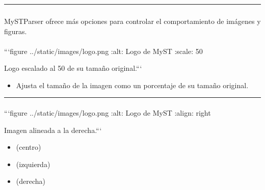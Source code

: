 \documentclass[a4paper,10pt,oneside,spanish,openany]{sphinxmanual}
\begin{document}
\bigskip\hrule\bigskip



\subsubsection{}
\label{\detokenize{configuracion_inicial/013.guia_de_myst_parser:opciones-avanzadas-para-imagenes-y-figuras}}
\sphinxAtStartPar
MyST\sphinxhyphen{}Parser ofrece más opciones para controlar el comportamiento de imágenes y figuras.


\paragraph{}
\label{\detokenize{configuracion_inicial/013.guia_de_myst_parser:escalar-imagenes}}
\begin{sphinxVerbatim}[commandchars=\\\{\}]
  ```\PYGZob{}figure\PYGZcb{} ../\PYGZus{}static/images/logo.png
  :alt: Logo de MyST
  :scale: 50\PYGZpc{}

  Logo escalado al 50\PYGZpc{} de su tamaño original.```
\end{sphinxVerbatim}
\begin{itemize}
\item {} 
\sphinxAtStartPar
{} Ajusta el tamaño de la imagen como un porcentaje de su tamaño original.

\end{itemize}


\bigskip\hrule\bigskip



\paragraph{}
\label{\detokenize{configuracion_inicial/013.guia_de_myst_parser:alinear-imagenes}}
\begin{sphinxVerbatim}[commandchars=\\\{\}]
  ```\PYGZob{}figure\PYGZcb{} ../\PYGZus{}static/images/logo.png
  :alt: Logo de MyST
  :align: right

  Imagen alineada a la derecha.```
\end{sphinxVerbatim}
\begin{itemize}
\item {} 
\sphinxAtStartPar
{} (centro)

\item {} 
\sphinxAtStartPar
{} (izquierda)

\item {} 
\sphinxAtStartPar
{} (derecha)

\end{itemize}
\end{document}
